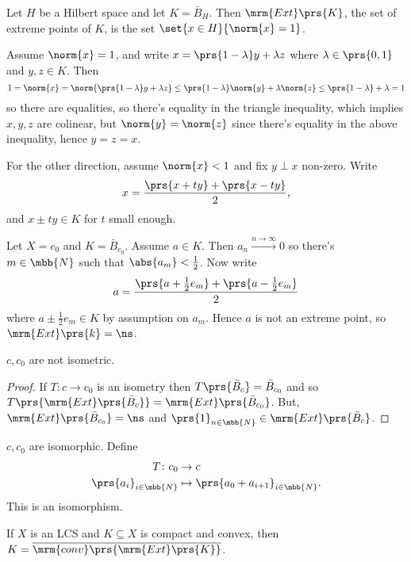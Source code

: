 \documentclass[10pt, twoside]{book}
\begin{document}
\begin{example}
Let $H$ be a Hilbert space and let $K = \bar{B}_{H}$. Then $\mrm{Ext}\prs{K}$, the set of extreme points of $K$, is the set $\set{x \in H}{\norm{x} = 1}$.

Assume $\norm{x} = 1$, and write $x = \prs{1-\lambda} y + \lambda z$ where $\lambda \in \prs{0,1}$ and $y,z \in K$. Then
\[1 = \norm{x} = \norm{\prs{1-\lambda}y + \lambda z} \leq \prs{1-\lambda}\norm{y} + \lambda\norm{z} \leq \prs{1-\lambda} + \lambda = 1\]
so there are equalities, so there's equality in the triangle inequality, which implies $x,y,z$ are colinear, but $\norm{y} = \norm{z}$ since there's equality in the above inequality, hence $y=z=x$.

For the other direction, assume $\norm{x} < 1$ and fix $y \perp x$ non-zero.
Write
\[x = \frac{\prs{x+ty} + \prs{x-ty}}{2} \text{,}\]
and $x\pm ty \in K$ for $t$ small enough.
\end{example}

\begin{example}
Let $X = c_0$ and $K = \bar{B}_{c_0}$. Assume $a \in K$. Then $a_n \xrightarrow{n\to\infty} 0$ so there's $m \in \mbb{N}$ such that $\abs{a_m} < \frac{1}{2}$. Now write
\[a = \frac{\prs{a + \frac{1}{2} e_m} + \prs{a - \frac{1}{2} e_m}}{2}\]
where $a \pm \frac{1}{2} e_m \in K$ by assumption on $a_m$. Hence $a$ is not an extreme point, so $\mrm{Ext}\prs{k} = \ns$.
\end{example}

\begin{corollary}
$c, c_0$ are not isometric.
\end{corollary}

\begin{proof}
If $T \colon c \to c_0$ is an isometry then $T\prs{\bar{B}_c} = \bar{B}_{c_0}$ and so $T\prs{\mrm{Ext}\prs{\bar{B}_c}} = \mrm{Ext}\prs{\bar{B}_{c_0}}$. But, $\mrm{Ext}\prs{\bar{B}_{c_0}} = \ns$ and $\prs{1}_{n \in \mbb{N}} \in \mrm{Ext}\prs{\bar{B}_c}$.
\end{proof}

\begin{remark}
$c, c_0$ are isomorphic. Define
\begin{align*}
T \colon c_0 &\to c \\
\prs{a_i}_{i \in \mbb{N}} &\mapsto \prs{a_0 + a_{i+1}}_{i \in \mbb{N}} \text{.}
\end{align*}
This is an isomorphism.
\end{remark}

\begin{theorem}\label{theorem:krein_milman}
If $X$ is an LCS and $K \subseteq X$ is compact and convex, then $K = \overline{\mrm{conv}\prs{\mrm{Ext}\prs{K}}}$.
\end{theorem}
\end{document}
